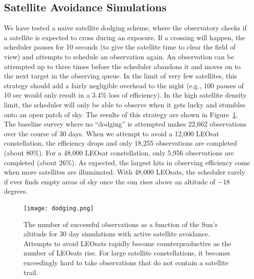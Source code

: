 \documentclass[twocolumn,trackchanges]{aastex63}
\begin{document}
 

\subsection{Satellite Avoidance Simulations} \label{subsec:dodge}
We have tested a naive satellite dodging scheme, where the observatory checks if a satellite is expected to cross during an exposure.
If a crossing will happen, the scheduler pauses for 10 seconds (to give the satellite time to clear the field of view) and attempts to schedule an observation again. An observation can be attempted up to three times before the scheduler abandons it and moves on to the next target in the observing queue. In the limit of very few satellites, this strategy should add a fairly negligible overhead to the night (e.g., 100 pauses of 10 sec would only result in a 3.4\% loss of efficiency). In the high satellite density limit, the scheduler will only be able to observe when it gets lucky and stumbles onto an open patch of sky. The results of this strategy are shown in Figure~\ref{fig:dodging}. The baseline survey where no ``dodging'' is attempted makes 22,662 observations over the course of 30 days.
When we attempt to avoid a 12,000 LEOsat constellation, the efficiency drops and only 18,255 observations are completed (about 80\%). For a 48,000 LEOsat constellation, only 5,956 observations are completed (about 26\%). As expected, the largest hits in observing efficiency come when more satellites are illuminated. With 48,000 LEOsats, the scheduler rarely if ever finds empty areas of sky once the sun rises above an altitude of $-18$ degrees. 

\begin{figure}[ht]
\texttt{[image: dodging.png]}
\caption{The number of successful observations as a function of the Sun's altitude for
30 day simulations with active satellite avoidance. Attempts to avoid LEOsats rapidly become counterproductive as the number of LEOsats rise. For large satellite constellations, it becomes exceedingly hard to take observations that do not contain a satellite trail.  
\label{fig:dodging}}
\end{figure}
\end{document}
